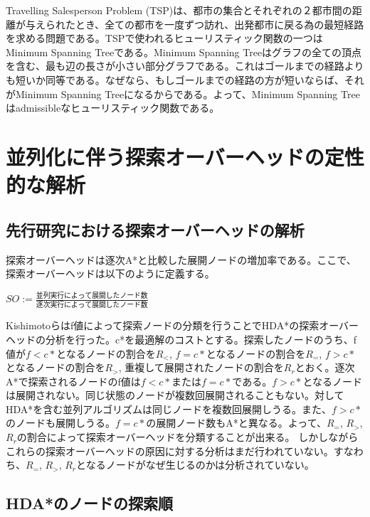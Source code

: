 \documentclass{jsarticle}
\begin{document}
Travelling Salesperson Problem (TSP)は、都市の集合とそれぞれの２都市間の距離が与えられたとき、全ての都市を一度ずつ訪れ、出発都市に戻る為の最短経路を求める問題である。TSPで使われるヒューリスティック関数の一つはMinimum Spanning Treeである。Minimum Spanning Treeはグラフの全ての頂点を含む、最も辺の長さが小さい部分グラフである。これはゴールまでの経路よりも短いか同等である。なぜなら、もしゴールまでの経路の方が短いならば、それがMinimum Spanning Treeになるからである。よって、Minimum Spanning Treeはadmissibleなヒューリスティック関数である。

\section{並列化に伴う探索オーバーヘッドの定性的な解析}
\label{ch:analysis1}

\subsection{先行研究における探索オーバーヘッドの解析}

探索オーバーヘッドは逐次A*と比較した展開ノードの増加率である。ここで、探索オーバーヘッドは以下のように定義する。

$SO := \frac{並列実行によって展開したノード数}{逐次実行によって展開したノード数}$

Kishimotoらはf値によって探索ノードの分類を行うことでHDA*の探索オーバーヘッドの分析を行った\cite{Kishimoto2013}。c*を最適解のコストとする。探索したノードのうち、f値が$f < c*$となるノードの割合を$R_{<}$, $f = c*$となるノードの割合を$R_{=}$, $f > c*$となるノードの割合を$R_{>}$, 重複して展開されたノードの割合を$R_{r}$とおく。逐次A*で探索されるノードのf値は$f < c*$または$f = c*$である。$f > c*$となるノードは展開されない。同じ状態のノードが複数回展開されることもない。対してHDA*を含む並列アルゴリズムは同じノードを複数回展開しうる。また、$f > c*$のノードも展開しうる。$f = c*$の展開ノード数もA*と異なる。よって、$R_{=}$, $R_{>}$, $R_{r}$の割合によって探索オーバーヘッドを分類することが出来る。
しかしながらこれらの探索オーバーヘッドの原因に対する分析はまだ行われていない。すなわち、$R_{=}$, $R_{>}$, $R_{r}$となるノードがなぜ生じるのかは分析されていない。

\subsection{HDA*のノードの探索順}
\end{document}
